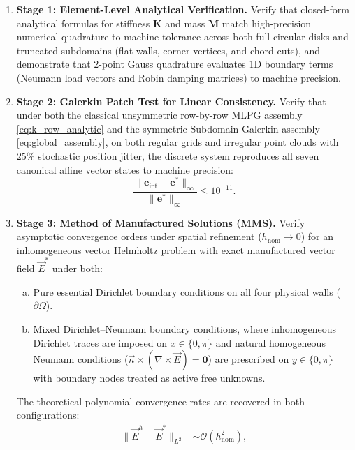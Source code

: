 \documentclass[VANCOUVER,Times1COL]{WileyNJD-v5}
\begin{document}
\begin{enumerate}
    \item \textbf{Stage 1: Element-Level Analytical Verification.} Verify that closed-form analytical formulas for stiffness $\mathbf{K}$ and mass $\mathbf{M}$ match high-precision numerical quadrature to machine tolerance across both full circular disks and truncated subdomains (flat walls, corner vertices, and chord cuts), and demonstrate that 2-point Gauss quadrature evaluates 1D boundary terms (Neumann load vectors and Robin damping matrices) to machine precision.
    \item \textbf{Stage 2: Galerkin Patch Test for Linear Consistency.} Verify that under both the classical unsymmetric row-by-row MLPG assembly \eqref{eq:k_row_analytic} and the symmetric Subdomain Galerkin assembly \eqref{eq:global_assembly}, on both regular grids and irregular point clouds with $25\%$ stochastic position jitter, the discrete system reproduces all seven canonical affine vector states to machine precision:
          \begin{equation}
              \frac{\|\mathbf{e}_{\mathrm{int}} - \mathbf{e}^*\|_{\infty}}{\|\mathbf{e}^*\|_{\infty}} \le 10^{-11}.
          \end{equation}
    \item \textbf{Stage 3: Method of Manufactured Solutions (MMS).} Verify asymptotic convergence orders under spatial refinement ($h_{\mathrm{nom}} \to 0$) for an inhomogeneous vector Helmholtz problem with exact manufactured vector field $\vec{E}^*$ under both:
          \begin{enumerate}[(a)]
              \item Pure essential Dirichlet boundary conditions on all four physical walls ($\partial\Omega$).
              \item Mixed Dirichlet--Neumann boundary conditions, where inhomogeneous Dirichlet traces are imposed on $x \in \{0, \pi\}$ and natural homogeneous Neumann conditions ($\vec{n} \times (\nabla \times \vec{E}) = \mathbf{0}$) are prescribed on $y \in \{0, \pi\}$ with boundary nodes treated as active free unknowns.
          \end{enumerate}
          The theoretical polynomial convergence rates are recovered in both configurations:
          \begin{equation}
              \begin{aligned}
                  \|\vec{E}^h - \vec{E}^*\|_{L^2}                                                                       & \sim \mathcal{O}(h_{\mathrm{nom}}^2), \\

\end{aligned}
\end{equation}
\end{enumerate}
\end{document}
